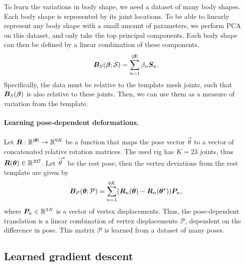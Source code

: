 To learn the variations in body shape, we need a dataset of many body shapes. Each body shape is
represented by its joint locations. To be able to linearly represent any body shape with a small
amount of parameters, we perform PCA on this dataset, and only take the top principal components.
Each body shape can then be defined by a linear combination of these components, \[
    \bm{B}_S(\bm{\beta}; \mathcal{S}) = \sum_{n=1}^{|\bm{\beta}|} \beta_n \bm{S}_n.
\]
Specifically, the data must be relative to the template mesh joints, such that
$\bm{B}_S(\bm{\beta})$ is also relative to these joints. Then, we can use them as a measure of
variation from the template.

\paragraph{Learning pose-dependent deformations.}

Let $\bm{R}: \mathbb{R}^{|\bm{\theta}|} \to \mathbb{R}^{9K}$ be a function that maps the pose vector
$\vec{\theta}$ to a vector of concatenated relative rotation matrices. The used rig has $K=23$ joints, thus
$\bm{R}(\bm{\theta}) \in \mathbb{R}^{207}$. Let $\vec{\theta}^\star$ be the rest pose, then the vertex
deviations from the rest template are given by \[
    \bm{B}_P(\bm{\theta}; \mathcal{P}) = \sum_{n=1}^{9K} (\bm{R}_n(\bm{\theta}) - \bm{R}_n(\bm{\theta}^\star)) \bm{P}_n,
\]
where $\bm{P}_n \in \mathbb{R}^{3N}$ is a vector of vertex displacements. Thus, the pose-dependent translation is a linear combination of
vertex displacements $\mathcal{P}$, dependent on the difference in pose. This matrix $\mathcal{P}$
is learned from a dataset of many poses.

\subsection{Learned gradient descent}

